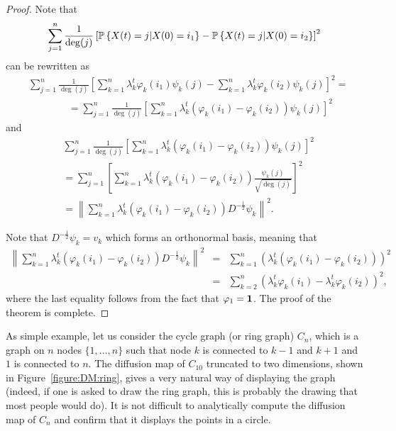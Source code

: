\begin{proof}
Note that 
$$\sum_{j=1}^n \frac{1}{\deg(j)}\left[  {\mathbb{P}}\left\{ X(t)=j | X(0) = {i_1}  \right\} - {\mathbb{P}}\left\{ X(t)=j | X(0) = {i_2}  \right\} \right]^2$$ 
can be rewritten as
\begin{align*} 
& \sum_{j=1}^n \frac{1}{\deg(j)}\left[  \sum_{k=1}^n \lambda_k^t \varphi_k(i_1) \psi_k(j) -  \sum_{k=1}^n \lambda_k^t \varphi_k(i_2) \psi_k(j) \right]^2  =  \\ & \qquad \qquad = \sum_{j=1}^n \frac{1}{\deg(j)}\left[  \sum_{k=1}^n \lambda_k^t\left( \varphi_k(i_1) - \varphi_k(i_2) \right) \psi_k(j) \right]^2
\end{align*}
and
\begin{align*}
& \sum_{j=1}^n \frac{1}{\deg(j)}\left[  \sum_{k=1}^n \lambda_k^t\left( \varphi_k(i_1) - \varphi_k(i_2) \right) \psi_k(j) \right]^2  \\    & = \sum_{j=1}^n \left[  \sum_{k=1}^n \lambda_k^t\left( \varphi_k(i_1) - \varphi_k(i_2) \right) \frac{\psi_k(j)}{\sqrt{\deg(j)}} \right]^2 \\
  & = \left\|  \sum_{k=1}^n \lambda_k^t\left( \varphi_k(i_1) - \varphi_k(i_2) \right) D^{-\frac12} \psi_k \right\|^2.
\end{align*}

Note that $D^{-\frac12}\psi_k = v_k$ which forms an orthonormal basis, meaning that
\begin{eqnarray*}
\left\|  \sum_{k=1}^n \lambda_k^t\left( \varphi_k(i_1) - \varphi_k(i_2) \right) D^{-\frac12} \psi_k \right\|^2 & = &\sum_{k=1}^n \left( \lambda_k^t\left( \varphi_k(i_1) - \varphi_k(i_2) \right)    \right)^2 \\
& = &\sum_{k=2}^n \left( \lambda_k^t \varphi_k(i_1) - \lambda_k^t\varphi_k(i_2)   \right)^2,
\end{eqnarray*}
where the last equality follows from the fact that $\varphi_1=\mathbf{1}$. The proof of the theorem is complete.

\end{proof}

As simple example, let us consider the cycle graph  (or ring graph) $C_n$, which is a graph on $n$ nodes $\{1,\dots,n\}$ such that node $k$ is connected to $k-1$ and $k+1$ and $1$ is connected to $n$. The diffusion map of $C_{10}$ truncated to two dimensions, shown in Figure~\ref{figure:DM:ring}, gives a very natural way of displaying the graph (indeed, if one is asked to draw the ring graph, this is probably the drawing that most people would do). It is not difficult to analytically compute the diffusion map of $C_n$ and confirm that it displays the points in a circle.


